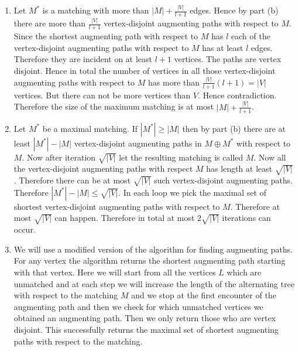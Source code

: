 \documentclass[a4paper, 11pt]{article}
\begin{document}
{\begin{enumerate}[label=\bfseries\alph*.]
Now $P$ is not vertex-disjoint from $P_1,\dots, P_k$. We will show that $P$ is edge disjoint from $P_i$ for all $i\in[k]$. Assume the contrary. Let there is an edge $e\in P$ such that $e\in P_i$. The edges before and after $e$ are from $E\setminus M'$ hence they are from $E\setminus M$. Since $P$ is also an augmenting path with respect to $M$, we have $e\in M$. But then $e$ can not be in  $P_i$. Hence contradiction. Therefore $P$ is edge disjoint from $P_1\dots, P_k$. Since $P$ is the shortest augmenting path with respect to $M'$ and the length of shortest augmenting path with respect to $M$ we have $|P|\geq l$. Therefore $|A|\geq (k+1)l$.
\item Let $M^*$ is a matching with more than $|M|+\frac{|V|}{l+1}$ edges. Hence by part (b) there are more than $\frac{|V|}{l+1}$ vertex-disjoint augmenting paths with respect to $M$. Since the shortest augmenting path with respect to $M$ has $l$ each of the vertex-disjoint augmenting paths with respect to $M$ has at least $l$ edges. Therefore they are incident on at least $l+1$ vertices. The paths are vertex disjoint. Hence in total the number of vertices in all those vertex-disjoint augmenting paths with respect to $M$ has more than $\frac{|V|}{l+1}(l+1)=|V|$ vertices. But there can not be more vertices than $V$. Hence contradiction. Therefore the size of the maximum matching is at most $|M|+\frac{|V|}{l+1}$.
\item Let $M^*$ be a maximal matching.  If $|M^*|\geq |M|$ then by part (b) there are at least $|M^*|-|M|$ vertex-disjoint augmenting paths in $M\oplus M^*$ with respect to $M$. Now after iteration $\sqrt{|V|}$ let the resulting matching is called $M$. Now all the vertex-disjoint  augmenting paths with respect $M$ has length at least $\sqrt{|V|}$. Therefore there can be at most $\sqrt{|V|}$ such vertex-disjoint augmenting paths. Therefore $|M^*|-|M|\leq \sqrt{|V|}$. In each loop we pick the maximal set of shortest vertex-disjoint augmenting paths with respect to $M$. Therefore at most $\sqrt{|V|}$ can happen. Therefore in total at most $2\sqrt{|V|}$ iterations can occur.
\item We will use a modified version of the algorithm for finding augmenting paths. For any vertex the algorithm returns the shortest augmenting path starting with that vertex. Here we will start from all the vertices $L$ which are unmatched and at each step we will increase the length of the alternating tree with respect to the matching $M$ and we stop at the first encounter of the augmenting path and then we check for which unmatched vertices we obtained an augmenting path. Then we only return those who are vertex disjoint. This successfully returns the maximal set of shortest augmenting paths with respect to the matching. \parinn


\end{enumerate}}
\end{document}
